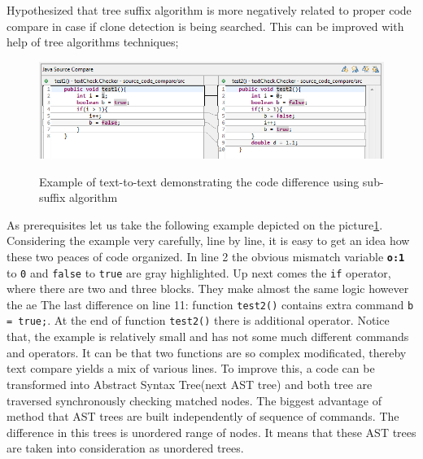 \documentclass{report}
\begin{document}
Hypothesized that tree suffix algorithm is more negatively related to proper code compare in case if clone detection is being searched. 
This can be improved with help of tree algorithms techniques;
\begin{figure}[h]
  \centering
  \includegraphics[width=1.00\textwidth]{Figures/text-to-text/text-compared-for-improve}\\[0.1cm]
  \caption[Text to text comparison example when lines of code are replaced]{Example of text-to-text demonstrating the code difference using sub-suffix algorithm }
  \label{fig:text-compared-for-improve}
\end{figure}
As prerequisites let us take the following example depicted on the picture\ref{fig:text-compared-for-improve}. Considering the example very carefully, line by line, it is easy to get an idea how these two peaces of code organized. In line 2 the obvious mismatch variable \textbf{\texttt{o:1}} to \texttt{0} and \texttt{false} to \texttt{true} are gray highlighted.
Up next comes the \texttt{if} operator, where there are two and three blocks. They make almost the same logic however the ae The last difference on line 11: function \texttt{test2()} contains extra command \texttt{b = true;}.
At the end of function \texttt{test2()} there is additional operator. Notice that, the example is relatively small and has not some much different commands and operators. It can be that two functions are so complex modificated, thereby text compare yields a mix of various lines. To improve this, a code can be transformed into Abstract Syntax Tree(next AST tree) and both tree are traversed synchronously checking matched nodes. The biggest advantage of method that AST trees are built independently of sequence of commands. The difference in this trees is unordered range of nodes. It means that these AST trees are taken into consideration as unordered trees.
\end{document}
